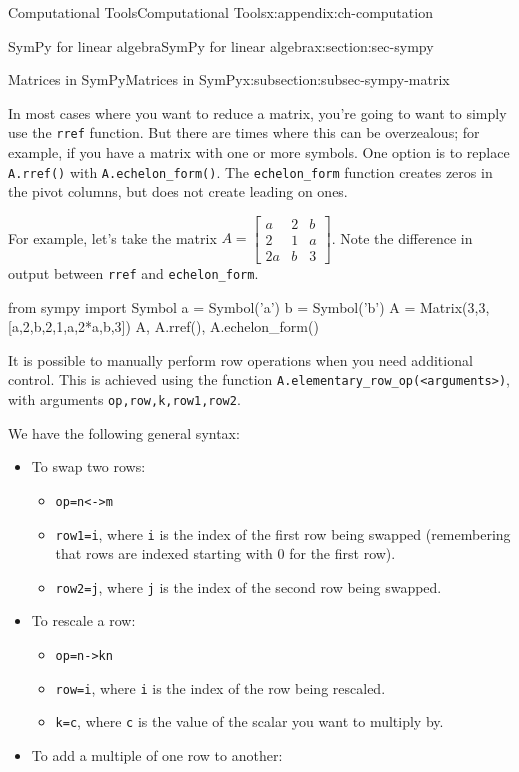 \documentclass[oneside,10pt,]{book}
\newcommand{\mono}[1]{\texttt{#1}}
\numberwithin{equation}{section}
\newcommand{\bbm}{\begin{bmatrix}}
\newcommand{\ebm}{\end{bmatrix}}
\newcommand{\amp}{&}
\begin{document}
\begin{appendixptx}{Computational Tools}{}{Computational Tools}{}{}{x:appendix:ch-computation}
\begin{sectionptx}{SymPy for linear algebra}{}{SymPy for linear algebra}{}{}{x:section:sec-sympy}
\begin{subsectionptx}{Matrices in SymPy}{}{Matrices in SymPy}{}{}{x:subsection:subsec-sympy-matrix}
\par
In most cases where you want to reduce a matrix, you're going to want to simply use the \mono{rref} function. But there are times where this can be overzealous; for example, if you have a matrix with one or more symbols. One option is to replace \mono{A.rref()} with \mono{A.echelon\_form()}. The \mono{echelon\_form} function creates zeros in the pivot columns, but does not create leading on ones.%
\par
For example, let's take the matrix \(A = \bbm a \amp 2\amp b\\2\amp 1\amp a\\2a\amp b\amp 3\ebm\). Note the difference in output between \mono{rref} and \mono{echelon\_form}.%
\begin{sageinput}
from sympy import Symbol
a = Symbol('a')
b = Symbol('b')
A = Matrix(3,3,[a,2,b,2,1,a,2*a,b,3])
A, A.rref(), A.echelon_form()
\end{sageinput}
It is possible to manually perform row operations when you need additional control. This is achieved using the function \mono{A.elementary\_row\_op(<arguments>)}, with arguments \mono{op,row,k,row1,row2}.%
\par
We have the following general syntax:%
\begin{itemize}[label=\textbullet]
\item{}To swap two rows:%
\begin{itemize}[label=$\circ$]
\item{}\mono{op=\textquotesingle{}n<->m\textquotesingle{}}%
\item{}\mono{row1=i}, where \mono{i} is the index of the first row being swapped (remembering that rows are indexed starting with \(0\) for the first row).%
\item{}\mono{row2=j}, where \mono{j} is the index of the second row being swapped.%
\end{itemize}
%
\item{}To rescale a row:%
\begin{itemize}[label=$\circ$]
\item{}\mono{op=\textquotesingle{}n->kn\textquotesingle{}}%
\item{}\mono{row=i}, where \mono{i} is the index of the row being rescaled.%
\item{}\mono{k=c}, where \mono{c} is the value of the scalar you want to multiply by.%
\end{itemize}
%
\item{}To add a multiple of one row to another:%
\begin{itemize}[label=$\circ$]

\end{itemize}
\end{itemize}
\end{subsectionptx}
\end{sectionptx}
\end{appendixptx}
\end{document}
